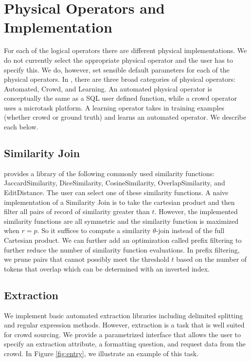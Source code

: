 \section{Physical Operators and Implementation}

For each of the logical operators there are different physical implementations.
We do not currently select the appropriate physical operator and the user has to specify this.
We do, however, set sensible default parameters for each of the physical operators.
In \projx, there are three broad categories of physical operators: Automated, Crowd, and Learning.
An automated physical operator is conceptually the same as a SQL user defined function, while a crowd operator uses a microtask platform.
A learning operator takes in training examples (whether crowd or ground truth) and learns an automated operator.
We describe each below.




\subsection{Similarity Join} 
\projx provides a library of the following commonly used similarity functions: \textsf{JaccardSimilarity}, \textsf{DiceSimilarity},
\textsf{CosineSimilarity}, \textsf{OverlapSimilarity}, and \textsf{EditDistance}.
The user can select one of these similarity functions.
A naive implementation of a Similarity Join is to take the cartesian product and then filter all pairs of record of similarity greater than $t$.
However, the implemented similarity functions are all symmetric and the similarity function is maximized when $r = p$.
So it suffices to compute a similarity $\theta$-join instead of the full Cartesian product.
We can further add an optimization called prefix filtering to further reduce the number of similarity function evaluations.
In prefix filtering, we prune pairs that cannot possibly meet the threshold $t$ based on the number of tokens that overlap which can be determined with an inverted index.


\subsection{Extraction}
We implement basic automated extraction libraries including delimited splitting and regular expression methods.
However, extraction is a task that is well suited for crowd sourcing.
We provide a parametrized interface that allows the user to specify an extraction attribute, a formatting question, and request data from the crowd.
In Figure \ref{fig:entry}, we illustrate an example of this task.

